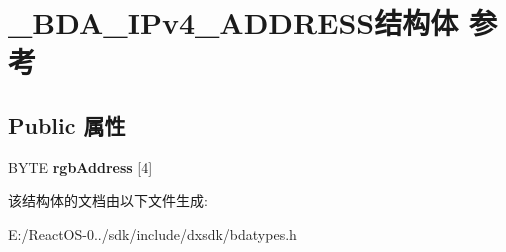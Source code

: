 \hypertarget{struct___b_d_a___i_pv4___a_d_d_r_e_s_s}{}\section{\+\_\+\+B\+D\+A\+\_\+\+I\+Pv4\+\_\+\+A\+D\+D\+R\+E\+S\+S结构体 参考}
\label{struct___b_d_a___i_pv4___a_d_d_r_e_s_s}
\subsection*{Public 属性}
\begin{DoxyCompactItemize}
\item 
\mbox{\label{struct___b_d_a___i_pv4___a_d_d_r_e_s_s_ae7cd0e5056d24940f143a379d3137638}} 
B\+Y\+TE {\bfseries rgb\+Address} \mbox{[}4\mbox{]}
\end{DoxyCompactItemize}


该结构体的文档由以下文件生成\+:\begin{DoxyCompactItemize}
\item 
E\+:/\+React\+O\+S-\/0../sdk/include/dxsdk/bdatypes.\+h\end{DoxyCompactItemize}
